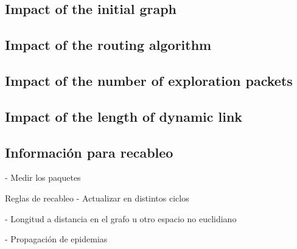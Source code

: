 \subsection{Impact of the initial graph}

\subsection{Impact of the routing algorithm}

\subsection{Impact of the number of exploration packets}

\subsection{Impact of the length of dynamic link}

\subsection{Información para recableo}
- Medir los paquetes 

Reglas de recableo
- Actualizar en distintos ciclos

- Longitud a distancia en el grafo u otro espacio no euclidiano

- Propagación de epidemias
